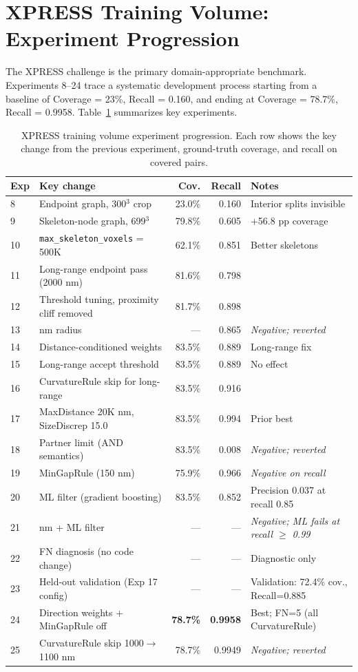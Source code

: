 \section{XPRESS Training Volume: Experiment Progression}

The XPRESS challenge is the primary domain-appropriate benchmark. Experiments
8--24 trace a systematic development process starting from a baseline of
Coverage = 23\%, Recall = 0.160, and ending at Coverage = 78.7\%,
Recall = 0.9958. Table~\ref{tab:xpress_progress} summarizes key experiments.

\begin{table}[H]
\centering
\caption{XPRESS training volume experiment progression. Each row shows the key
change from the previous experiment, ground-truth coverage, and recall on covered pairs.}
\label{tab:xpress_progress}
\small
\begin{tabularx}{\textwidth}{@{}l>{\RaggedRight}Xrr>{\RaggedRight}X@{}}
\toprule
Exp & Key change & Cov. & Recall & Notes \\
\midrule
8  & Endpoint graph, 300$^3$ crop & 23.0\% & 0.160 & Interior splits invisible \\
9  & Skeleton-node graph, 699$^3$ & 79.8\% & 0.605 & +56.8 pp coverage \\
10 & \texttt{max\_skeleton\_voxels} = 500K & 62.1\% & 0.851 & Better skeletons \\
11 & Long-range endpoint pass (2000 nm) & 81.6\% & 0.798 & \\
12 & Threshold tuning, proximity cliff removed & 81.7\% & 0.898 & \\
13 & 3000 nm radius & --- & 0.865 & \textit{Negative; reverted} \\
14 & Distance-conditioned weights & 83.5\% & 0.889 & Long-range fix \\
15 & Long-range accept threshold & 83.5\% & 0.889 & No effect \\
16 & CurvatureRule skip for long-range & 83.5\% & 0.916 & \\
17 & MaxDistance 20K nm, SizeDiscrep 15.0 & 83.5\% & 0.994 & Prior best \\
\midrule
18 & Partner limit (AND semantics) & 83.5\% & 0.008 & \textit{Negative; reverted} \\
19 & MinGapRule (150 nm) & 75.9\% & 0.966 & \textit{Negative on recall} \\
20 & ML filter (gradient boosting) & 83.5\% & 0.852 & Precision 0.037 at recall 0.85 \\
21 & 3000 nm + ML filter & --- & --- & \textit{Negative; ML fails at recall $\geq$ 0.99} \\
22 & FN diagnosis (no code change) & --- & --- & Diagnostic only \\
\midrule
23 & Held-out validation (Exp 17 config) & --- & --- & Validation: 72.4\% cov., Recall=0.885 \\
24 & Direction weights + MinGapRule off & \textbf{78.7\%} & \textbf{0.9958} & Best; FN=5 (all CurvatureRule) \\
25 & CurvatureRule skip 1000$\to$1100 nm & 78.7\% & 0.9949 & \textit{Negative; reverted} \\
\bottomrule
\end{tabularx}
\end{table}

